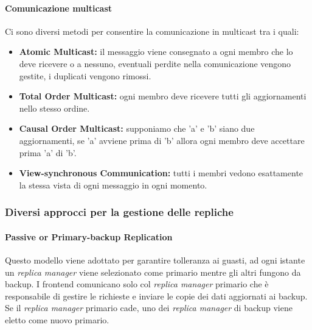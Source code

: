 \documentclass{article}
\begin{document}
\paragraph{Comunicazione multicast}
Ci sono diversi metodi per consentire la comunicazione in multicast tra i quali:
\begin{itemize}
    \item \textbf{Atomic Multicast:} il messaggio viene consegnato a ogni membro che lo deve ricevere o a nessuno, eventuali perdite nella comunicazione vengono gestite, i duplicati vengono rimossi.
    \item \textbf{Total Order Multicast:} ogni membro deve ricevere tutti gli aggiornamenti nello stesso ordine.
    \item \textbf{Causal Order Multicast:} supponiamo che 'a' e 'b' siano due aggiornamenti, se 'a' avviene prima di 'b' allora ogni membro deve accettare prima 'a' di 'b'.
    \item \textbf{View-synchronous Communication:} tutti i membri vedono esattamente la stessa vista di ogni messaggio in ogni momento.
\end{itemize}
\subsubsection{Diversi approcci per la gestione delle repliche}
\paragraph{Passive or Primary-backup Replication}
Questo modello viene adottato per garantire tolleranza ai guasti, ad ogni istante un \textit{replica manager} viene selezionato come primario mentre gli altri fungono da backup. I frontend comunicano solo col \textit{replica manager} primario che è responsabile di gestire le richieste e inviare le copie dei dati aggiornati ai backup. Se il \textit{replica manager} primario cade, uno dei \textit{replica manager} di backup viene eletto come nuovo primario.
\end{document}

